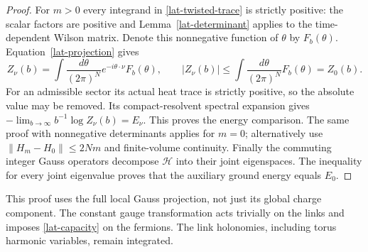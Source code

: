 \begin{proof}
For $m>0$ every integrand in \eqref{lat-twisted-trace} is strictly
positive: the scalar factors are positive and
Lemma~\ref{lat-determinant} applies to the time-dependent Wilson
matrix.  Denote this nonnegative function of $\theta$ by $F_b(\theta)$.
Equation~\eqref{lat-projection} gives
\begin{equation}
 Z_\nu(b)=\int\frac{d\theta}{(2\pi)^N}
          e^{-i\theta\cdot\nu}F_b(\theta),\qquad
 |Z_\nu(b)|\le\int\frac{d\theta}{(2\pi)^N}F_b(\theta)=Z_0(b).
 \label{lat-character-bound}
\end{equation}
For an admissible sector its actual heat trace is strictly positive,
so the absolute value may be removed.  Its compact-resolvent spectral
expansion gives
$-\lim_{b\to\infty}b^{-1}\log Z_\nu(b)=E_\nu$.
This proves the energy comparison.  The same proof with nonnegative
determinants applies for $m=0$; alternatively use
$\|H_m-H_0\|\le2Nm$ and finite-volume continuity.
Finally the commuting integer Gauss operators decompose
$\mathcal H$ into their joint eigenspaces.  The inequality for every
joint eigenvalue proves that the auxiliary ground energy equals $E_0$.
\end{proof}

This proof uses the full local Gauss projection, not just its global
charge component.  The constant gauge transformation acts trivially on
the links and imposes \eqref{lat-capacity} on the fermions.  The link
holonomies, including torus harmonic variables, remain integrated.

